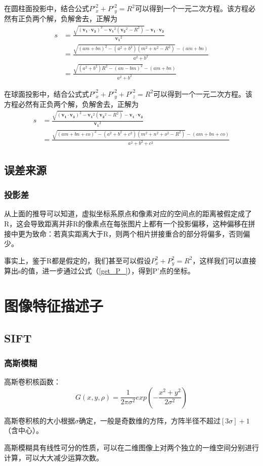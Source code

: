 \documentclass{ctexart}
\renewcommand{\vec}[1]{\boldsymbol{#1}} %
\begin{document}
{	在圆柱面投影中，结合公式${P'}_x^2 + {P'}_y^2 = R^2$可以得到一个一元二次方程。该方程必然有正负两个解，负解舍去，正解为
	\begin{equation}
	\begin{split}
	s
	&= \frac{\sqrt{(\vec{v_1}\cdot\vec{v_2})^2 - \vec{v_1}^2(\vec{v_2}^2-R^2)} - \vec{v_1}\cdot\vec{v_2}}{\vec{v_1}^2} \\
	&= \frac{\sqrt{(am+bn)^2-(a^2+b^2)(m^2+n^2-R^2)}-(am+bn)}{a^2+b^2} \\
	&= \frac{\sqrt{(a^2+b^2)R^2 - (an-bm)^2}-(am+bn)}{a^2+b^2}
	\end{split}
	\end{equation}
	
	在球面投影中，结合公式式${P'}_x^2 + {P'}_y^2 + {P'}_z^2 = R^2$可以得到一个一元二次方程。该方程必然有正负两个解，负解舍去，正解为
	\begin{equation}
	\begin{split}
	s
	&= \frac{\sqrt{(\vec{v_1}\cdot\vec{v_2})^2 - \vec{v_1}^2(\vec{v_2}^2-R^2)} - \vec{v_1}\cdot\vec{v_2}}{\vec{v_1}^2} \\
	&=\frac{\sqrt{(a m+b n+c o)^2-(a^2+b^2+c^2) (m^2+n^2+o^2-R^2)}-(am+bn+co)}{a^2+b^2+c^2}
	\end{split}
	\end{equation}
	
	\subsection{误差来源}
	\subsubsection{投影差}
	从上面的推导可以知道，虚拟坐标系原点和像素对应的空间点的距离被假定成了R，这会导致距离并非R的像素点在每张图片上都有一个投影偏移，这种偏移在拼接中更为致命：若真实距离大于R，则两个相片拼接重合的部分将偏多，否则偏少。
	\par
	事实上，鉴于R都是假定的，我们甚至可以假设$P_x^2 + P_y^2 = R^2$，这样我们可以直接算出s的值，进一步通过公式（\ref{get_P_}），得到P'点的坐标。
	
	
	
	\section{图像特征描述子}
	\subsection{SIFT}
	\subsubsection{高斯模糊}
	高斯卷积核函数：
	\begin{equation}
	G(x,y,\rho)=\frac{1}{2 \pi \sigma^2} exp\left(-\frac{x^2+y^2}{2\sigma^2}\right)
	\end{equation}
	\par
	高斯卷积核的大小根据$\sigma$确定，一般是奇数维的方阵，方阵半径不超过$[3\sigma]+1$（含中心）。
	\par 高斯模糊具有线性可分的性质，可以在二维图像上对两个独立的一维空间分别进行计算，可以大大减少运算次数。
}
\end{document}
